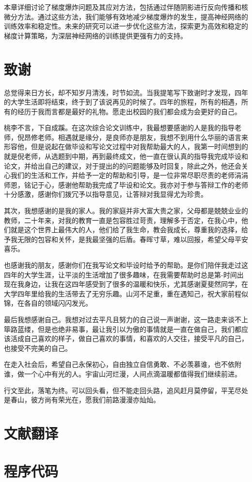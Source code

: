 \documentclass[12pt,a4paper]{amsart}
\begin{document}
本章详细讨论了梯度爆炸问题及其应对方法，包括通过伴随阴影进行反向传播和核微分方法。通过这些方法，我们能够有效地减少梯度爆炸的发生，提高神经网络的训练效率和稳定性。未来的研究可以进一步优化这些方法，探索更为高效和稳定的梯度计算策略，为深层神经网络的训练提供更强有力的支持。

\section{致谢}

总觉得来日方长，却不知岁月清浅，时节如流。当我提笔写下致谢时才发现，四年的大学生活即将结束，终于到了该说再见的时候了。四年的旅程，所有的相遇，所有的经历于我而言都是最好的礼物。愿走出校园的我们都会成为会更好的自己。

桃李不言，下自成蹊。在这次综合论文训练中，我最想要感谢的人是我的指导老师，倪昂修老师。相遇就是缘分，是良师亦是朋友，我想不到用什么华丽的语言来形容他，但是说起在做毕设和写论文过程中对我帮助最大的人，我第一时间想到的就是倪老师，从选题到中期，再到最终成文，他一直在很认真的指导我完成毕设和论文，并给出自己的建议，对于提出的的问题能够及时回复，除此之外，他还会关心我们的生活和工作，并给予一定的帮助和引导，是一位非常尽职尽责的老师涓涓师恩，铭记于心，感谢他帮助我完成了毕设和论文。我亦对于参与答辩工作的老师十分感激，感谢你们拨冗予以指导意见，让答辩对我显得尤为珍贵。

其次，我想感谢的是我的家人。我的家庭并非大富大贵之家，父母都是兢兢业业的教师，二十年来，对我的教育一直是包容胜过苛责，理解多于否定，在我心中，他们就是这个世界上最伟大的人，他们给了我生命，教会我成长，尊重我的选择，给予我无限的包容和关怀，是我最坚强的后盾。春晖寸草，难以回报，希望父母平安喜乐。

也感谢我的朋友，感谢你们在我写论文和毕设时给予的帮助。是你们陪伴我走过这四年的大学生涯，让平淡的生活增加了很多趣味，在我需要帮助时总是第-时间出现在我身边，让我在这四年感受到了很多的温暖和快乐，尤其感谢夏斐然同学，在大学四年里给我的生活带去了无穷乐趣。山河不足重，重在遇知己，祝大家前程似锦，在各自的领域闪闪发光。

最后我想感谢自己。我想对过去平凡且努力的自己说一声谢谢，这一路走来谈不上筚路蓝缕，但是也绝非易事，最让我引以为傲的事情就是一直在做自己，我们都应该活成自己喜欢的样子，做自己喜欢的事情，和喜欢的人交往，接受平凡的自己，也接受不完美的自己。

在走入社会后，希望自己永保初心，自由独立自信勇敢、不必羡慕谁，也不依附谁，做一个心中有光的人。宇宙山河烂漫，人间点滴温暖都值得我们继续前进。

行文至此，落笔为终。可以回头看，但不能走回头路，追风赶月莫停留，平芜尽处是春山，彼方尚有荣光在，愿我们前路漫漫亦灿灿。

{\footnotesize}

\appendix

\section{文献翻译}

\section{程序代码}
\end{document}
